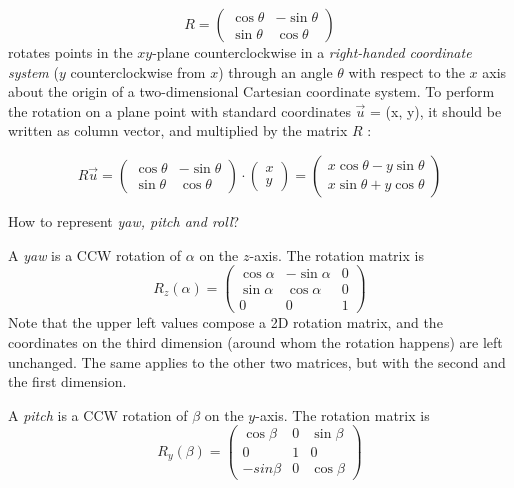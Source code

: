 \[
	R =
	{\begin{pmatrix}
		\cos \theta & -\sin \theta \\
		\sin \theta & \cos \theta
	\end{pmatrix}}
\]
rotates points in the $xy$-plane counterclockwise in a \textit{right-handed coordinate system} ($y$ counterclockwise from $x$) through an angle $\theta$ with respect to the $x$ axis about the origin of a two-dimensional Cartesian coordinate system. To perform the rotation on a plane point with standard coordinates $\vec u$ = (x, y), it should be written as column vector, and multiplied by the matrix $R$ \cite{WikipediaRotationM}:
\bigbreak

\[
	R \vec u =
	{\begin{pmatrix}
		\cos \theta &-\sin \theta \\
		\sin \theta &\cos \theta
	\end{pmatrix}}
	\cdot
	{\begin{pmatrix}
		x \\
		y
	\end{pmatrix}} =
	{\begin{pmatrix}
		x\cos \theta -y\sin \theta \\
		x\sin \theta +y\cos \theta
	\end{pmatrix}}
\]
\bigbreak

How to represent \textit{yaw, pitch and roll}?
\bigbreak

A \textit{yaw} is a CCW rotation of $\alpha$ on the $z$-axis. The rotation matrix is
\[
	R_z(\alpha) =
	\begin{pmatrix}
		\cos\alpha & -\sin\alpha & 0 \\
		\sin\alpha & \cos\alpha & 0 \\
		0 & 0 & 1
	\end{pmatrix}
\]
Note that the upper left values compose a 2D rotation matrix, and the coordinates on the third dimension (around whom the rotation happens) are left unchanged. The same applies to the other two matrices, but with the second and the first dimension.
\bigbreak

A \textit{pitch} is a CCW rotation of $\beta$ on the $y$-axis. The rotation matrix is
\[
	R_y(\beta) =
	\begin{pmatrix}
		\cos\beta & 0 & \sin\beta \\
		0 & 1 & 0 \\
		-sin\beta & 0 & \cos\beta
	\end{pmatrix}
\]

